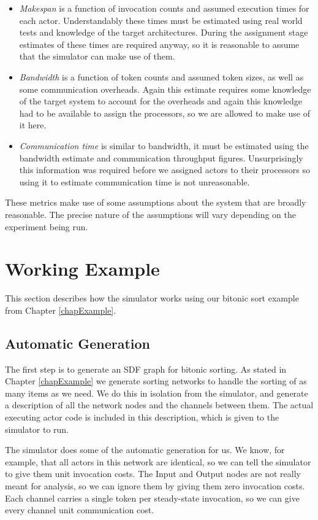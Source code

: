 \begin{itemize}
	\item {\em Makespan} is a function of invocation counts and assumed execution times for each actor.
			Understandably these times must be estimated using real world tests and knowledge of the target architectures.
			During the assignment stage estimates of these times are required anyway, so it is reasonable to assume that the simulator can make use of them.
	\item {\em Bandwidth} is a function of token counts and assumed token sizes, as well as some communication overheads.
			Again this estimate requires some knowledge of the target system to account for the overheads and again this knowledge had to be available to assign the processors, so we are allowed to make use of it here.
	\item {\em Communication time} is similar to bandwidth, it must be estimated using the bandwidth estimate and communication throughput figures.
			Unsurprisingly this information was required before we assigned actors to their processors so using it to estimate communication time is not unreasonable.
\end{itemize}

\noindent
These metrics make use of some assumptions about the system that are broadly reasonable.
The precise nature of the assumptions will vary depending on the experiment being run.

\section{Working Example}

This section describes how the simulator works using our bitonic sort example from Chapter \ref{chapExample}.

\subsection{Automatic Generation}

The first step is to generate an SDF graph for bitonic sorting.
As stated in Chapter \ref{chapExample} we generate sorting networks to handle the sorting of as many items as we need.
We do this in isolation from the simulator, and generate a description of all the network nodes and the channels between them.
The actual executing actor code is included in this description, which is given to the simulator to run.

The simulator does some of the automatic generation for us.
We know, for example, that all actors in this network are identical, so we can tell the simulator to give them unit invocation costs.
The Input and Output nodes are not really meant for analysis, so we can ignore them by giving them zero invocation costs.
Each channel carries a single token per steady-state invocation, so we can give every channel unit communication cost.

